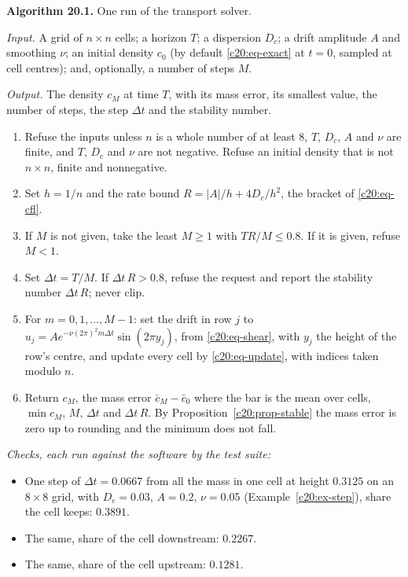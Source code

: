 \begin{mdframed}[linecolor=gray!60,backgroundcolor=gray!5]
\textbf{Algorithm 20.1.} One run of the transport solver.\par\smallskip
\textit{Input.} A grid of $n\times n$ cells; a horizon $T$; a dispersion $D_c$; a drift amplitude $A$ and smoothing $\nu$;
an initial density $c_0$ (by default \eqref{c20:eq-exact} at $t=0$, sampled at cell centres); and, optionally, a number
of steps $M$.\par
\textit{Output.} The density $c_M$ at time $T$, with its mass error, its smallest value, the number of steps, the
step $\Delta t$ and the stability number.
\begin{enumerate}
\item Refuse the inputs unless $n$ is a whole number of at least 8, $T$, $D_c$, $A$ and $\nu$ are finite, and $T$,
$D_c$ and $\nu$ are not negative. Refuse an initial density that is not $n\times n$, finite and nonnegative.
\item Set $h=1/n$ and the rate bound $R=|A|/h+4D_c/h^2$, the bracket of \eqref{c20:eq-cfl}.
\item If $M$ is not given, take the least $M\ge1$ with $TR/M\le0.8$. If it is given, refuse $M<1$.
\item Set $\Delta t=T/M$. If $\Delta t\,R>0.8$, refuse the request and report the stability number $\Delta t\,R$; never clip.
\item For $m=0,1,\dots,M-1$: set the drift in row $j$ to $u_j=Ae^{-\nu(2\pi)^2m\Delta t}\sin(2\pi y_j)$, from \eqref{c20:eq-shear},
with $y_j$ the height of the row's centre, and update every cell by \eqref{c20:eq-update}, with indices taken
modulo $n$.
\item Return $c_M$, the mass error $\bar c_M-\bar c_0$ where the bar is the mean over cells, $\min c_M$, $M$, $\Delta t$ and
$\Delta t\,R$. By Proposition~\ref{c20:prop-stable} the mass error is zero up to rounding and the minimum does not
fall.
\end{enumerate}
\textit{Checks, each run against the software by the test suite:}
\begin{itemize}
\item One step of $\Delta t=0.0667$ from all the mass in one cell at height $0.3125$ on an $8\times8$ grid, with
$D_c=0.03$, $A=0.2$, $\nu=0.05$ (Example~\ref{c20:ex-step}), share the cell keeps: $0.3891$.
\item The same, share of the cell downstream: $0.2267$.
\item The same, share of the cell upstream: $0.1281$.

\end{itemize}
\end{mdframed}
